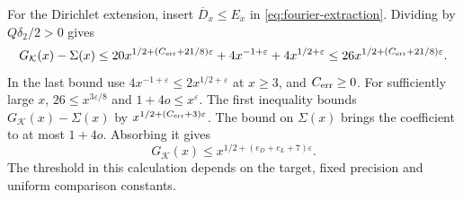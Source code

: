 For the Dirichlet extension, insert \(\overline D_x\le E_x\) in
\eqref{eq:fourier-extraction}. Dividing by \(Q\delta_2/2>0\) gives
\[
 G_{\mathcal K}(x)-\Sigma(x)\le
 20x^{1/2+(C_{\rm err}+21/8)\varepsilon}
 +4x^{-1+\varepsilon}+4x^{1/2+\varepsilon}
 \le 26x^{1/2+(C_{\rm err}+21/8)\varepsilon}.
\]
In the last bound use \(4x^{-1+\varepsilon}\le2x^{1/2+\varepsilon}\)
at \(x\ge3\), and \(C_{\rm err}\ge0\).
For sufficiently large \(x\), \(26\le x^{3\varepsilon/8}\) and
\(1+4o\le x^\varepsilon\). The first inequality bounds
\(G_{\mathcal K}(x)-\Sigma(x)\) by \(x^{1/2+(C_{\rm err}+3)\varepsilon}\).
The bound on \(\Sigma(x)\) brings the coefficient to at most \(1+4o\).
Absorbing it gives
\begin{equation}
\label{eq:fourier-pointwise}
 G_{\mathcal K}(x)\le x^{1/2+(e_D+e_L+7)\varepsilon} .
\end{equation}
The threshold in this calculation depends on the target, fixed
precision and uniform comparison constants.
